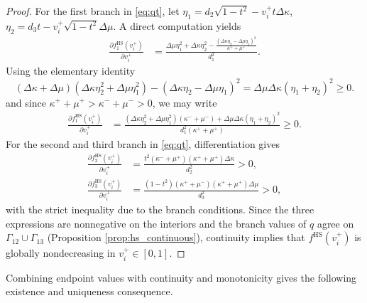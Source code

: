 \documentclass[preprint,3p]{elsarticle}
\begin{document}
\begin{proof}
    For the first branch in \eqref{eq:qt}, let $\eta_1 = d_2 \sqrt{1-t^2} - v_i^+ t \Delta\kappa$, $\eta_2 = d_3 t - v_i^+ \sqrt{1-t^2} \Delta\mu$. A direct computation yields
    \begin{equation}
    \begin{aligned}
        \frac{\partial f^{\mathrm{HS}}_1 (v_i^+)}{\partial v_i^+}&= \frac{\Delta\mu \eta_1^2 + \Delta \kappa \eta_2^2 - \frac{(\Delta\kappa\eta_2 -\Delta\mu\eta_1)^2}{\kappa^+ + \mu^+}}{d_1^2}.
    \end{aligned}
    \end{equation}
    Using the elementary identity
    \begin{equation}
        (\Delta\kappa + \Delta\mu)(\Delta\kappa\eta_2^2 + \Delta\mu\eta_1^2) - (\Delta\kappa\eta_2 - \Delta\mu\eta_1)^2 = \Delta\mu \Delta\kappa (\eta_1 + \eta_2)^2 \ge 0.
    \end{equation}    
    and since $\kappa^+ + \mu^+ > \kappa^- + \mu^- > 0$, we may write
    \begin{equation}
    \begin{aligned}
        \frac{\partial f^{\mathrm{HS}}_1 (v_i^+)}{\partial v_i^+}&= \frac{(\Delta\kappa\eta_2^2 + \Delta\mu\eta_1^2)(\kappa^- + \mu^-) + \Delta\mu \Delta\kappa(\eta_1 + \eta_2)^2}{d_1^2(\kappa^+ + \mu^+)} \ge 0.
    \end{aligned}
    \end{equation}
    For the second and third branch in \eqref{eq:qt}, differentiation gives
    \begin{subequations}\label{eq:hs_derivative23}
    \begin{align}
        \frac{\partial f^{\mathrm{HS}}_2 (v_i^+)}{\partial v_i^+} &= \frac{t^2 (\kappa^- + \mu^+) (\kappa^++\mu^+) \Delta\kappa}{d_2^2} > 0,\\
        \frac{\partial f^{\mathrm{HS}}_3 (v_i^+)}{\partial v_i^+} &= \frac{(1-t^2) (\kappa^+ + \mu^-) (\kappa^++\mu^+) \Delta\mu}{d_3^2} > 0,
    \end{align}
    \end{subequations}
    with the strict inequality due to the branch conditions. Since the three expressions are nonnegative on the interiors and the branch values of $q$ agree on $\Gamma_{12} \cup \Gamma_{13}$ (Proposition \ref{prop:hs_continuous}), continuity implies that $f^{\mathrm{HS}}(v_i^+)$ is globally nondecreasing in $v_i^+ \in [0,1]$. 
\end{proof}

Combining endpoint values with continuity and monotonicity gives the following existence and uniqueness consequence.
\end{document}
